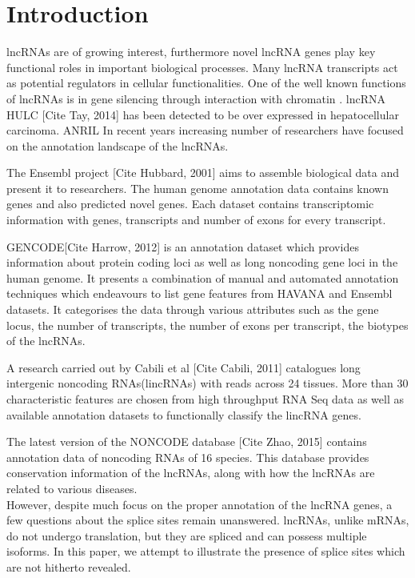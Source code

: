 \documentclass[ncrna,article,submit,moreauthors,pdftex,10pt,a4paper]{mdpi}
\begin{document}
\section{Introduction}

lncRNAs are of growing interest, furthermore novel lncRNA genes play key functional roles in important biological processes.
Many lncRNA transcripts act as potential regulators in cellular functionalities. One of the well known functions of lncRNAs is 
in gene silencing through interaction with chromatin \cite{guttmannat2012}. lncRNA HULC \cite{tay2014}[Cite Tay, 2014] has been detected to be over expressed in hepatocellular carcinoma. ANRIL 
In recent years increasing number of researchers have focused on the annotation landscape of the lncRNAs.

The Ensembl project \cite{flicek2014}[Cite Hubbard, 2001] aims to assemble biological data and present it to researchers. The human genome annotation data contains known genes
and also predicted novel genes. Each dataset contains transcriptomic information with genes, transcripts and number of exons for every transcript.

GENCODE\cite{harrow2012}[Cite Harrow, 2012] is an annotation dataset which provides information about protein coding loci as well as long noncoding gene loci in the human genome. 
It presents a combination of manual and automated annotation techniques which endeavours to list gene features from HAVANA and Ensembl datasets.
It categorises the data through various attributes such as the gene locus, the number of transcripts, the number of exons per transcript, 
the biotypes of the lncRNAs.

A research carried out by Cabili et al \cite{cabili2011}[Cite Cabili, 2011] catalogues long intergenic noncoding RNAs(lincRNAs) with reads across 24 tissues. More than 30 characteristic features 
are chosen from high throughput RNA Seq data as well as available annotation datasets to functionally classify the lincRNA genes.

The latest version of the NONCODE database \cite{zhao2016}[Cite Zhao, 2015] contains annotation data of noncoding RNAs of 16 species. This database provides conservation 
information of the lncRNAs, along with how the lncRNAs are related to various diseases.\\

However, despite much focus on the proper annotation of the lncRNA genes, a few questions about the splice sites remain unanswered. lncRNAs, unlike mRNAs,
do not undergo translation, but they are spliced and can possess multiple isoforms. In this paper, we attempt to illustrate the presence of 
splice sites which are not hitherto revealed. 
\end{document}
